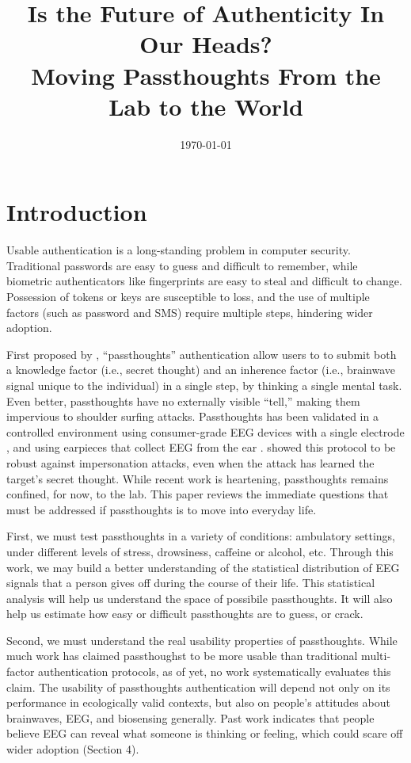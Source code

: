 \documentclass[sigconf]{acmart}
\date{\today}
\title{Is the Future of Authenticity In Our Heads?\\\medskip
\large Moving Passthoughts From the Lab to the World}
\begin{document}
\maketitle

\section{Introduction}
\label{sec:org87242b0}

Usable authentication is a long-standing problem in computer security.
Traditional passwords are easy to guess and difficult to remember,
while biometric authenticators like fingerprints are easy to steal and difficult to change.
Possession of tokens or keys are susceptible to loss, 
and the use of multiple factors (such as password and SMS) require multiple steps, hindering wider adoption.

First proposed by \cite{Thorpe2005}, ``passthoughts'' authentication allow users to 
to submit both a knowledge factor (i.e., secret thought) and an inherence factor (i.e., brainwave signal unique to the individual) 
in a single step, by thinking a single mental task.
Even better, passthoughts have no externally visible ``tell,'' making them impervious to shoulder surfing attacks.
Passthoughts has been validated in a controlled environment using consumer-grade EEG devices with a single electrode \cite{Chuang2013b}, 
and using earpieces that collect EEG from the ear \cite{curranpassthoughts}.
\cite{Johnson2014} showed this protocol to be robust against impersonation attacks, even when the attack has learned the target's secret thought.
While recent work is heartening, passthoughts remains confined, for now, to the lab.
This paper reviews the immediate questions that must be addressed if passthoughts is to move into everyday life.

First, we must test passthoughts in a variety of conditions: ambulatory settings, under different levels of stress, drowsiness, caffeine or alcohol, etc.
Through this work, we may build a better understanding of the statistical distribution of EEG signals that a person gives off during the course of their life. 
This statistical analysis will help us understand the space of possibile passthoughts. 
It will also help us estimate how easy or difficult passthoughts are to guess, or crack.

Second, we must understand the real usability properties of passthoughts.
While much work has claimed passthoughst to be more usable than traditional multi-factor authentication protocols,
as of yet, no work systematically evaluates this claim.
The usability of passthoughts authentication will depend not only on its performance in ecologically valid contexts,
but also on people's attitudes about brainwaves, EEG, and biosensing generally.
Past work indicates that people believe EEG can reveal what someone is thinking or feeling, which could scare off wider adoption (Section 4).
\end{document}

